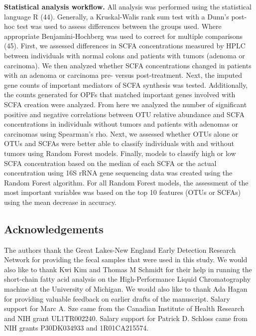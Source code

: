 \documentclass[11pt,]{article}
\begin{document}
\textbf{Statistical analysis workflow.} All analysis was performed using
the statistical language R (44). Generally, a Kruskal-Walis rank sum
test with a Dunn's post-hoc test was used to assess differences between
the groups used. Where appropriate Benjamini-Hochberg was used to
correct for multiple comparisons (45). First, we assessed differences in
SCFA concentrations measured by HPLC between individuals with normal
colons and patients with tumors (adenoma or carcinoma). We then analyzed
whether SCFA concentrations changed in patients with an adenoma or
carcinoma pre- versus post-treatment. Next, the imputed gene counts of
important mediators of SCFA synthesis was tested. Additionally, the
counts generated for OPFs that matched important genes involved with
SCFA creation were analyzed. From here we analyzed the number of
significant positive and negative correlations between OTU relative
abundance and SCFA concentrations in individuals without tumors and
patients with adenomas or carcinomas using Spearman's rho. Next, we
assessed whether OTUs alone or OTUs and SCFAs were better able to
classify individuals with and without tumors using Random Forest models.
Finally, models to classify high or low SCFA concentration based on the
median of each SCFA or the actual concentration using 16S rRNA gene
sequencing data was created using the Random Forest algorithm. For all
Random Forest models, the assessment of the most important variables was
based on the top 10 features (OTUs or SCFAs) using the mean decrease in
accuracy.

\newpage

\subsection{Acknowledgements}\label{acknowledgements}

The authors thank the Great Lakes-New England Early Detection Research
Network for providing the fecal samples that were used in this study. We
would also like to thank Kwi Kim and Thomas M Schmidt for their help in
running the short-chain fatty acid analysis on the High-Performance
Liquid Chromatography machine at the University of Michigan. We would
also like to thank Ada Hagan for providing valuable feedback on earlier
drafts of the manuscript. Salary support for Marc A. Sze came from the
Canadian Institute of Health Research and NIH grant UL1TR002240. Salary
support for Patrick D. Schloss came from NIH grants P30DK034933 and
1R01CA215574.

\newpage
\end{document}
